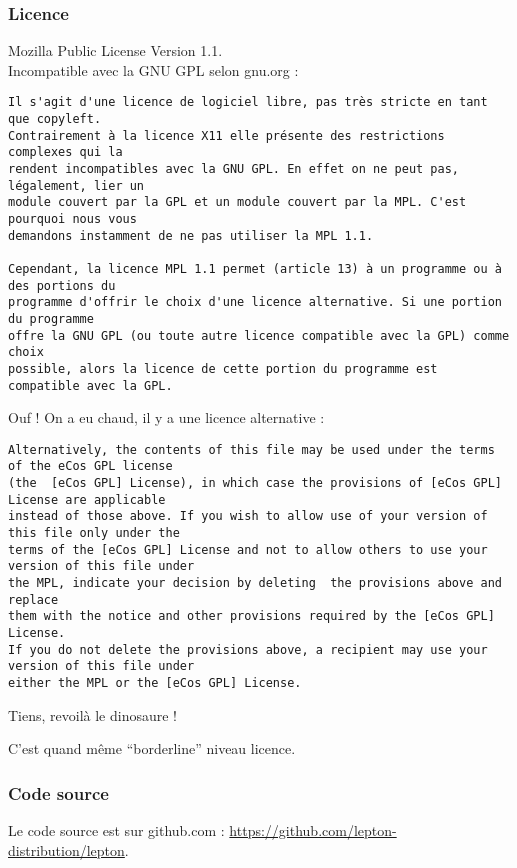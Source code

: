 \subsubsection{Licence}
Mozilla Public License Version 1.1.\\

Incompatible avec la GNU GPL selon gnu.org\cite{ref2} :

{\small
\begin{verbatim}
Il s'agit d'une licence de logiciel libre, pas très stricte en tant que copyleft.
Contrairement à la licence X11 elle présente des restrictions complexes qui la
rendent incompatibles avec la GNU GPL. En effet on ne peut pas, légalement, lier un
module couvert par la GPL et un module couvert par la MPL. C'est pourquoi nous vous
demandons instamment de ne pas utiliser la MPL 1.1.

Cependant, la licence MPL 1.1 permet (article 13) à un programme ou à des portions du
programme d'offrir le choix d'une licence alternative. Si une portion du programme
offre la GNU GPL (ou toute autre licence compatible avec la GPL) comme choix
possible, alors la licence de cette portion du programme est compatible avec la GPL.
\end{verbatim}
}

Ouf ! On a eu chaud, il y a une licence alternative :

{\footnotesize
\begin{verbatim}
Alternatively, the contents of this file may be used under the terms of the eCos GPL license 
(the  [eCos GPL] License), in which case the provisions of [eCos GPL] License are applicable 
instead of those above. If you wish to allow use of your version of this file only under the
terms of the [eCos GPL] License and not to allow others to use your version of this file under 
the MPL, indicate your decision by deleting  the provisions above and replace 
them with the notice and other provisions required by the [eCos GPL] License. 
If you do not delete the provisions above, a recipient may use your version of this file under 
either the MPL or the [eCos GPL] License.
\end{verbatim}
}

Tiens, revoilà le dinosaure !

C'est quand même \enquote{borderline} niveau licence.

\subsubsection{Code source}
Le code source est sur github.com :
\url{https://github.com/lepton-distribution/lepton}.

